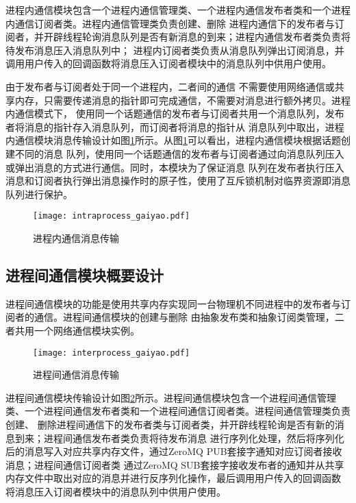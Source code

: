 进程内通信模块包含一个进程内通信管理类、一个进程内通信发布者类和一个进程内通信订阅者类。进程内通信管理类负责创建、删除
进程内通信下的发布者与订阅者，并开辟线程轮询消息队列是否有新消息的到来；进程内通信发布者类负责将待发布消息压入消息队列中；
进程内订阅者类负责从消息队列弹出订阅消息，并调用用户传入的回调函数将消息压入订阅者模块中的消息队列中供用户使用。

由于发布者与订阅者处于同一个进程内，二者间的通信
不需要使用网络通信或共享内存，只需要传递消息的指针即可完成通信，不需要对消息进行额外拷贝。进程内通信模式下，
使用同一个话题通信的发布者与订阅者共用一个消息队列，发布者将消息的指针存入消息队列，而订阅者将消息的指针从
消息队列中取出，进程内通信模块消息传输设计如图\ref{intraprocess_gaiyao}所示。从图\ref{intraprocess_gaiyao}可以看出，进程内通信模块根据话题创建不同的消息
队列，使用同一个话题通信的发布者与订阅者通过向消息队列压入或弹出消息的方式进行通信。同时，本模块为了保证消息
队列在发布者执行压入消息和订阅者执行弹出消息操作时的原子性，使用了互斥锁机制对临界资源即消息队列进行保护。
\begin{figure}[H]
  \centering
  \texttt{[image: intraprocess\_gaiyao.pdf]}
  \caption{进程内通信消息传输}
  \label{intraprocess_gaiyao}
\end{figure}

\subsection{进程间通信模块概要设计}
进程间通信模块的功能是使用共享内存实现同一台物理机不同进程中的发布者与订阅者的通信。进程间通信模块的创建与删除
由抽象发布类和抽象订阅类管理，二者共用一个网络通信模块实例。

\begin{figure}[H]
  \centering
  \texttt{[image: interprocess\_gaiyao.pdf]}
  \caption{进程间通信消息传输}
  \label{interprocess_gaiyao}
\end{figure}

进程间通信模块传输设计如图\ref{interprocess_gaiyao}所示。进程间通信模块包含一个进程间通信管理类、一个进程间通信发布者类和一个进程间通信订阅者类。进程间通信管理类负责创建、
删除进程间通信下的发布者类与订阅者类，并开辟线程轮询是否有新的消息到来；进程间通信发布者类负责将待发布消息
进行序列化处理，然后将序列化后的消息写入对应共享内存文件，通过ZeroMQ PUB套接字通知对应订阅者接收消息；进程间通信订阅者类
通过ZeroMQ SUB套接字接收发布者的通知并从共享内存文件中取出对应的消息并进行反序列化操作，最后调用用户传入的回调函数
将消息压入订阅者模块中的消息队列中供用户使用。

